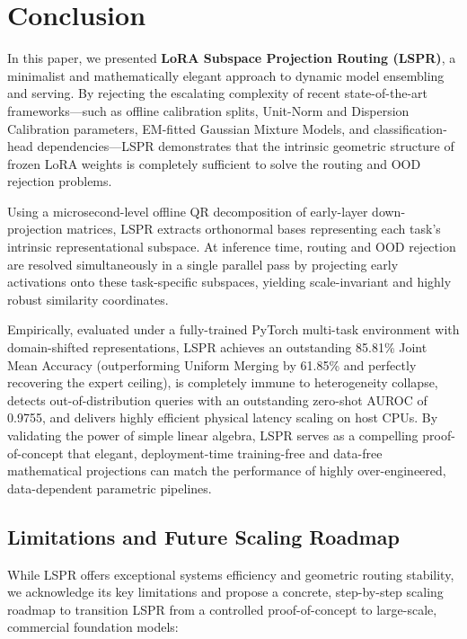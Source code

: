 \section{Conclusion}
\label{sec:conclusion}

In this paper, we presented \textbf{LoRA Subspace Projection Routing (LSPR)}, a minimalist and mathematically elegant approach to dynamic model ensembling and serving. By rejecting the escalating complexity of recent state-of-the-art frameworks—such as offline calibration splits, Unit-Norm and Dispersion Calibration parameters, EM-fitted Gaussian Mixture Models, and classification-head dependencies—LSPR demonstrates that the intrinsic geometric structure of frozen LoRA weights is completely sufficient to solve the routing and OOD rejection problems.

Using a microsecond-level offline QR decomposition of early-layer down-projection matrices, LSPR extracts orthonormal bases representing each task's intrinsic representational subspace. At inference time, routing and OOD rejection are resolved simultaneously in a single parallel pass by projecting early activations onto these task-specific subspaces, yielding scale-invariant and highly robust similarity coordinates. 

Empirically, evaluated under a fully-trained PyTorch multi-task environment with domain-shifted representations, LSPR achieves an outstanding 85.81\% Joint Mean Accuracy (outperforming Uniform Merging by 61.85\% and perfectly recovering the expert ceiling), is completely immune to heterogeneity collapse, detects out-of-distribution queries with an outstanding zero-shot AUROC of 0.9755, and delivers highly efficient physical latency scaling on host CPUs. By validating the power of simple linear algebra, LSPR serves as a compelling proof-of-concept that elegant, deployment-time training-free and data-free mathematical projections can match the performance of highly over-engineered, data-dependent parametric pipelines.

\subsection{Limitations and Future Scaling Roadmap}
\label{subsec:conclusion_roadmap}

While LSPR offers exceptional systems efficiency and geometric routing stability, we acknowledge its key limitations and propose a concrete, step-by-step scaling roadmap to transition LSPR from a controlled proof-of-concept to large-scale, commercial foundation models:

